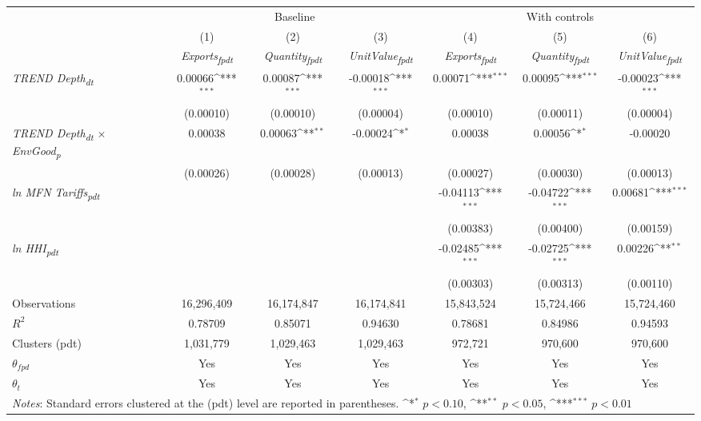 {
\def\sym#1{\ifmmode^{#1}\else\(^{#1}\)\fi}
\begin{tabular}{l*{6}{c}}
\toprule
&\multicolumn{3}{c}{Baseline}&\multicolumn{3}{c}{With controls}\\\cmidrule(lr){2-4}\cmidrule(lr){5-7}
&(1)&(2)&(3)&(4)&(5)&(6)\\
&\textit{Exports\textsubscript{fpdt}}&\textit{Quantity\textsubscript{fpdt}}&\textit{UnitValue\textsubscript{fpdt}}&\textit{Exports\textsubscript{fpdt}}&\textit{Quantity\textsubscript{fpdt}}&\textit{UnitValue\textsubscript{fpdt}}\\
\midrule
\textit{TREND Depth\textsubscript{dt}} & 0.00066\sym{***} & 0.00087\sym{***} & -0.00018\sym{***} & 0.00071\sym{***} & 0.00095\sym{***} & -0.00023\sym{***}\\
 & (0.00010) & (0.00010) & (0.00004) & (0.00010) & (0.00011) & (0.00004)\\
\addlinespace
\textit{TREND Depth\textsubscript{dt} $\times$ EnvGood\textsubscript{p}} & 0.00038 & 0.00063\sym{**} & -0.00024\sym{*} & 0.00038 & 0.00056\sym{*} & -0.00020\\
 & (0.00026) & (0.00028) & (0.00013) & (0.00027) & (0.00030) & (0.00013)\\
\addlinespace
\textit{ln MFN Tariffs\textsubscript{pdt}} &  &  &  & -0.04113\sym{***} & -0.04722\sym{***} & 0.00681\sym{***}\\
 &  &  &  & (0.00383) & (0.00400) & (0.00159)\\
\addlinespace
\textit{ln HHI\textsubscript{pdt}} &  &  &  & -0.02485\sym{***} & -0.02725\sym{***} & 0.00226\sym{**}\\
 &  &  &  & (0.00303) & (0.00313) & (0.00110)\\
\midrule
Observations & 16,296,409 & 16,174,847 & 16,174,841 & 15,843,524 & 15,724,466 & 15,724,460\\
$R^{2}$ & 0.78709 & 0.85071 & 0.94630 & 0.78681 & 0.84986 & 0.94593\\
Clusters (pdt) & 1,031,779 & 1,029,463 & 1,029,463 & 972,721 & 970,600 & 970,600\\
$\theta_{fpd}$ & Yes & Yes & Yes & Yes & Yes & Yes\\
$\theta_{t}$ & Yes & Yes & Yes & Yes & Yes & Yes\\
\bottomrule
\multicolumn{7}{l}{\footnotesize \textit{Notes}: Standard errors clustered at the (pdt) level are reported in parentheses. \sym{*} \(p<0.10\), \sym{**} \(p<0.05\), \sym{***} \(p<0.01\)}\\
\end{tabular}
}
